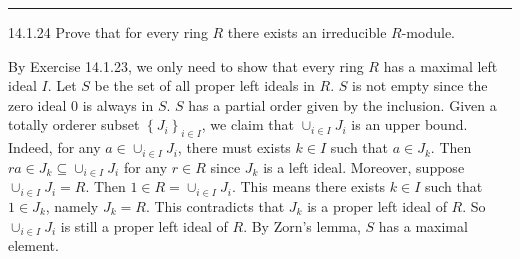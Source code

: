 \documentclass[a4paper, 12pt]{article}
\begin{document}
\noindent\rule{7in}{2.8pt}
\begin{problem}{14.1.24}
Prove that for every ring \(R\) there exists an irreducible \(R\)-module.
\end{problem}
\begin{solution}
By Exercise 14.1.23, we only need to show that every ring \(R\) has a maximal left ideal \(I\). Let \(S\) be the set of all proper left ideals in \(R\). \(S\) is not empty since the zero ideal \(0\) is always in \(S\). \(S\) has a partial order given by the inclusion. Given a totally orderer subset 
\(\left\{ J_i \right\}_{i\in I}\), we claim that \(\cup_{i\in I}J_i\) is an upper bound. Indeed, for any \(a\in \cup_{i\in I}J_i\), there must exists \(k\in I\) such that \(a\in J_k\). Then \(ra\in J_k\subseteq \cup_{i\in I}J_i\) for any \(r\in R\) since \(J_k\) is a left ideal. Moreover, suppose \(\cup_{i\in I}J_i=R\). Then 
\(1\in R=\cup_{i\in I}J_i\). This means there exists \(k\in I\) such that \(1\in J_k\), namely \(J_k=R\). This contradicts that \(J_k\) is a proper left ideal of \(R\). So \(\cup_{i\in I}J_i\) is still a proper left ideal of \(R\). By Zorn's lemma, \(S\) has a maximal element.
\end{solution}
\end{document}
